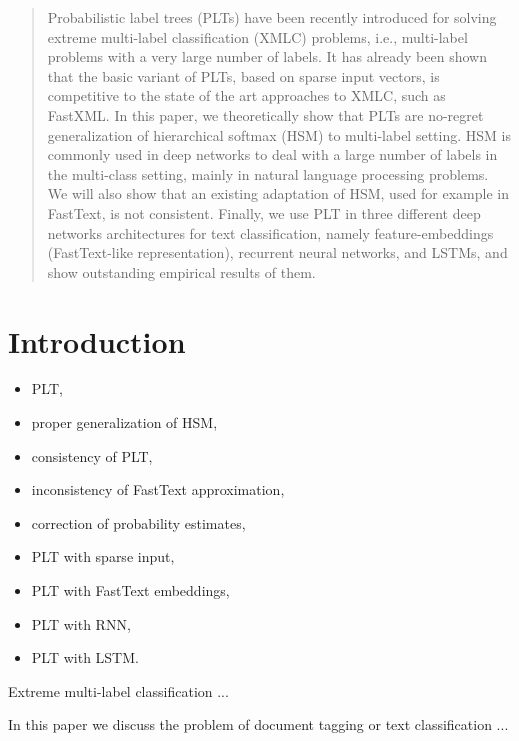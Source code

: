 \documentclass{article}
\begin{document}
 


\begin{abstract} 
Probabilistic label trees (PLTs) have been recently introduced for solving extreme multi-label classification (XMLC) problems, i.e., multi-label problems with a very large number of labels. It has already been shown that the basic variant of PLTs, based on sparse input vectors, is competitive to the state of the art approaches to XMLC, such as FastXML. In this paper, we theoretically show that PLTs are no-regret generalization of hierarchical softmax (HSM) to multi-label setting. HSM is commonly used in deep networks to deal with a large number of labels in the multi-class setting, mainly in natural language processing problems. We will also show that an existing adaptation of HSM, used for example in FastText, is not consistent. Finally, we use PLT in three different deep networks architectures for text classification, namely feature-embeddings (FastText-like representation), recurrent neural networks, and LSTMs, and show outstanding empirical results of them.
\end{abstract} 

\section{Introduction}
\label{sec:formal}

\begin{itemize}
\item PLT, 
\item proper generalization of HSM, 
\item consistency of PLT, 
\item inconsistency of FastText approximation, 
\item correction of probability estimates, 
\item PLT with sparse input, 
\item PLT with FastText embeddings, 
\item PLT with RNN, 
\item PLT with LSTM.
\end{itemize}

Extreme multi-label classification ...

In this paper we discuss the problem of document tagging or text classification ...
\end{document}
